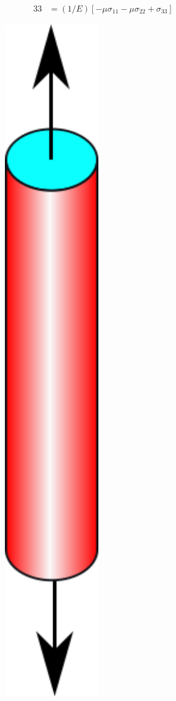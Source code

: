 \documentclass[notes]{beamer}
\begin{document}
\begin{frame}
\begin{minipage}[t]{0.89\linewidth}
\begin{align*}
{33} & = (1/E)\left[-\mu \sigma_{11} - \mu \sigma_{22} + \sigma_{33}\right]
		\end{align*}
\end{minipage}%
\hfill%
\begin{minipage}[t]{0.1\linewidth}
	\begin{figure}
		\includegraphics[width=0.6\textwidth]{figs/hookes-law.png}
	\end{figure}
\end{minipage}	
\end{frame}
\end{document}
